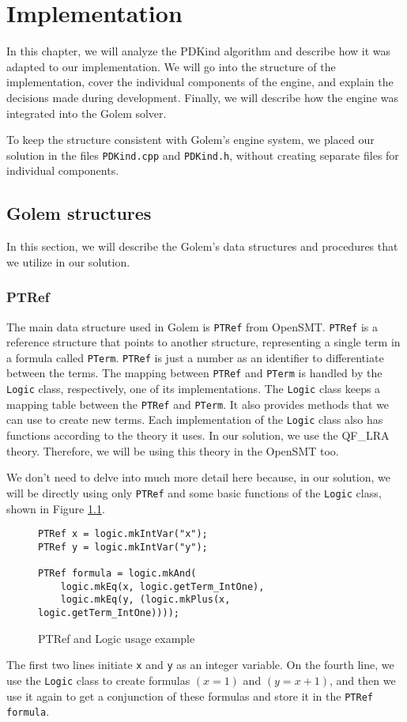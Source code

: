 \chapter{Implementation}
\noindent In this chapter, we will analyze the PDKind algorithm and describe
how it was adapted to our implementation. We will go into the structure of the
implementation, cover the individual components of the engine, and explain the
decisions made during development. Finally, we will describe how the engine was
integrated into the Golem solver.

To keep the structure consistent with Golem's engine system, we placed our
solution in the files \texttt{PDKind.cpp} and \texttt{PDKind.h}, without
creating separate files for individual components.

\section{Golem structures}
\noindent In this section, we will describe the Golem's data structures and procedures that we utilize in our solution. 

\subsection{PTRef}
\noindent The main data structure used in Golem is \texttt{PTRef} from OpenSMT.
\texttt{PTRef} is a reference structure that points to another structure,
representing a single term in a formula called \texttt{PTerm}. \texttt{PTRef}
is just a number as an identifier to differentiate between the terms. The
mapping between \texttt{PTRef} and \texttt{PTerm} is handled by the
\texttt{Logic} class, respectively, one of its implementations. The
\texttt{Logic} class keeps a mapping table between the \texttt{PTRef} and
\texttt{PTerm}. It also provides methods that we can use to create new terms.
Each implementation of the \texttt{Logic} class also has functions according to
the theory it uses. In our solution, we use the QF\_LRA theory. Therefore, we
will be using this theory in the OpenSMT too. 

We don't need to delve into much more detail here because, in our solution, we
will be directly using only \texttt{PTRef} and some basic functions of the
\texttt{Logic} class, shown in Figure \ref{ex:PTref}.

\renewcommand{\figurename}{Figure}
\lstset{style=cppstyle}
\begin{figure}[h]
\begin{lstlisting}
PTRef x = logic.mkIntVar("x");
PTRef y = logic.mkIntVar("y");

PTRef formula = logic.mkAnd(
    logic.mkEq(x, logic.getTerm_IntOne),
    logic.mkEq(y, (logic.mkPlus(x, logic.getTerm_IntOne))));
\end{lstlisting}
\caption{PTRef and Logic usage example}\label{ex:PTref}
\end{figure}
The first two lines initiate \texttt{x} and \texttt{y} as an integer variable.
On the fourth line, we use the \texttt{Logic} class to create formulas $(x =
1)$ and $(y = x + 1)$, and then we use it again to get a conjunction of these
formulas and store it in the \texttt{PTRef formula}.

